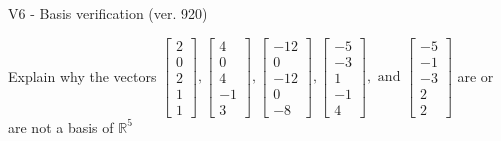 \begin{exercise}
  \begin{exerciseTitle}V6 - Basis verification (ver. 920)\end{exerciseTitle}
  \begin{exerciseStatement}
    Explain why the vectors \(\left[\begin{array}{r}
2 \\
0 \\
2 \\
1 \\
1
\end{array}\right] , \left[\begin{array}{r}
4 \\
0 \\
4 \\
-1 \\
3
\end{array}\right] , \left[\begin{array}{r}
-12 \\
0 \\
-12 \\
0 \\
-8
\end{array}\right] , \left[\begin{array}{r}
-5 \\
-3 \\
1 \\
-1 \\
4
\end{array}\right] , \text{ and } \left[\begin{array}{r}
-5 \\
-1 \\
-3 \\
2 \\
2
\end{array}\right]\) are or are not a basis of \(\mathbb{R}^5\)	



\end{exerciseStatement}
\end{exercise}
